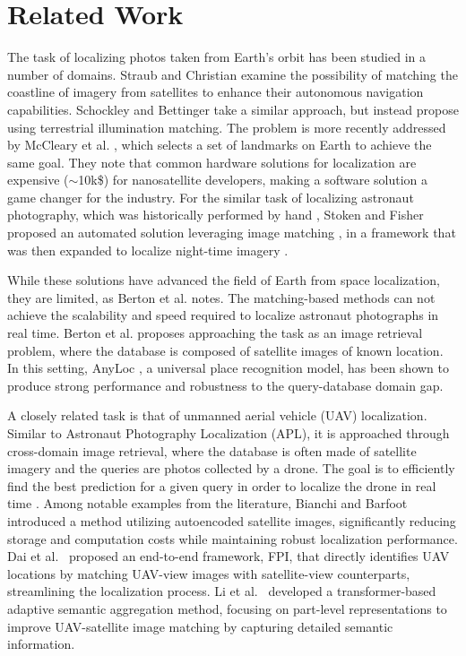 
\section{Related Work}
\label{sec:related_work}
The task of localizing photos taken from Earth's orbit has been studied in a number of domains.
Straub and Christian \cite{Straub_2015_sat_loc} examine the possibility of matching the coastline of imagery from satellites to enhance their autonomous navigation capabilities. Schockley and Bettinger \cite{Shockley_2021_sat_loc} take a similar approach, but instead propose using terrestrial illumination matching.
The problem is more recently addressed by McCleary et al. \cite{McCleary_2024_vinsat}, which selects a set of landmarks on Earth to achieve the same goal. They note that common hardware solutions for localization are expensive ($\sim$10k\$) for nanosatellite developers, making a software solution a game changer for the industry.
For the similar task of localizing astronaut photography, which was historically performed by hand \cite{Stoken_2023_CVPR}, Stoken and Fisher proposed an automated solution leveraging image matching \cite{Stoken_2023_CVPR}, in a framework that was then expanded to localize night-time imagery \cite{Stoken_2024_CVPR}.

While these solutions have advanced the field of Earth from space localization, they are limited, as Berton et al. \cite{Berton_2024_EarthLoc} notes. The matching-based methods can not achieve the scalability and speed required to localize astronaut photographs in real time. Berton et al. proposes approaching the task as an image retrieval problem, where the database is composed of satellite images of known location.
In this setting, AnyLoc \cite{Keetha_2023_AnyLoc}, a universal place recognition model, has been shown to produce strong performance and robustness to the query-database domain gap.

A closely related task is that of unmanned aerial vehicle (UAV) localization. Similar to Astronaut Photography Localization (APL), it is approached through cross-domain image retrieval, where the database is often made of satellite imagery and the queries are photos collected by a drone.
The goal is to efficiently find the best prediction for a given query in order to localize the drone in real time \cite{Zheng_2023_UAV_workshop}.
Among notable examples from the literature, 
Bianchi and Barfoot~\cite{bianchi2021uav} introduced a method utilizing autoencoded satellite images, significantly reducing storage and computation costs while maintaining robust localization performance. Dai et al.~\cite{dai2022finding} proposed an end-to-end framework, FPI, that directly identifies UAV locations by matching UAV-view images with satellite-view counterparts, streamlining the localization process. Li et al.~\cite{li2024transformer} developed a transformer-based adaptive semantic aggregation method, focusing on part-level representations to improve UAV-satellite image matching by capturing detailed semantic information.

